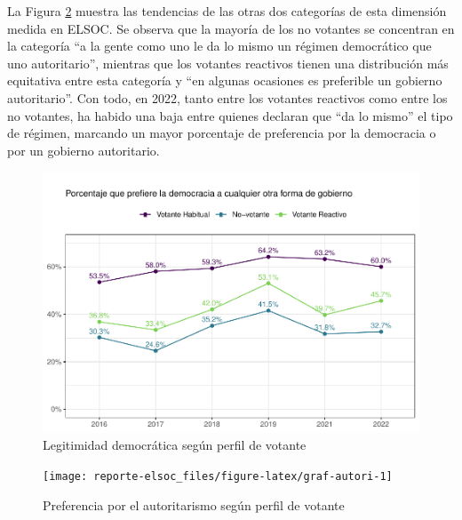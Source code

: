 \documentclass[
  12pt,
]{book}
\begin{document}
La Figura \ref{fig:graf-autori} muestra las tendencias de las otras dos categorías de esta dimensión medida en ELSOC. Se observa que la mayoría de los no votantes se concentran en la categoría ``a la gente como uno le da lo mismo un régimen democrático que uno autoritario'', mientras que los votantes reactivos tienen una distribución más equitativa entre esta categoría y ``en algunas ocasiones es preferible un gobierno autoritario''. Con todo, en 2022, tanto entre los votantes reactivos como entre los no votantes, ha habido una baja entre quienes declaran que ``da lo mismo'' el tipo de régimen, marcando un mayor porcentaje de preferencia por la democracia o por un gobierno autoritario.

\begin{figure}

{\centering \includegraphics{reporte-elsoc_files/figure-latex/graf-leg-dem-2-1} 

}

\caption{Legitimidad democrática según perfil de votante}\label{fig:graf-leg-dem-2}
\end{figure}

\begin{figure}

{\centering \texttt{[image: reporte-elsoc\_files/figure-latex/graf-autori-1]} 

}

\caption{Preferencia por el autoritarismo según perfil de votante}\label{fig:graf-autori}
\end{figure}
\end{document}
